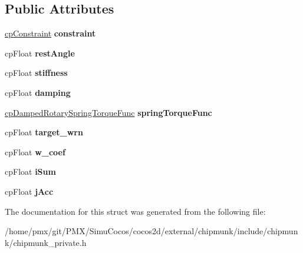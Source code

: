 \subsection*{Public Attributes}
\begin{DoxyCompactItemize}
\item 
\mbox{\label{structcpDampedRotarySpring_a57fd3d4154ca7f372245053e6953d3c6}} 
\hyperlink{structcpConstraint}{cp\+Constraint} {\bfseries constraint}
\item 
\mbox{\label{structcpDampedRotarySpring_a4a821b6b0e54400d892ce92d6990acdc}} 
cp\+Float {\bfseries rest\+Angle}
\item 
\mbox{\label{structcpDampedRotarySpring_ac2804128c9b92915ac8687367ff7c1ee}} 
cp\+Float {\bfseries stiffness}
\item 
\mbox{\label{structcpDampedRotarySpring_a3e85982c0b4f5aca75740fb83e5cae65}} 
cp\+Float {\bfseries damping}
\item 
\mbox{\label{structcpDampedRotarySpring_ab4bed9fc4db268dee126b07fe65ee8c3}} 
\hyperlink{group__cpDampedRotarySpring_ga072c236959020fab4f30087b5234040b}{cp\+Damped\+Rotary\+Spring\+Torque\+Func} {\bfseries spring\+Torque\+Func}
\item 
\mbox{\label{structcpDampedRotarySpring_aa92c6904380fe7f8f4fe9b0d76805885}} 
cp\+Float {\bfseries target\+\_\+wrn}
\item 
\mbox{\label{structcpDampedRotarySpring_a79e849ee8a77d2e9e433723f5e255a36}} 
cp\+Float {\bfseries w\+\_\+coef}
\item 
\mbox{\label{structcpDampedRotarySpring_a17b3619d2dcc24424ec3d853ac3cce2a}} 
cp\+Float {\bfseries i\+Sum}
\item 
\mbox{\label{structcpDampedRotarySpring_a85cb4bace17f0418d471e9dff81ff54f}} 
cp\+Float {\bfseries j\+Acc}
\end{DoxyCompactItemize}


The documentation for this struct was generated from the following file\+:\begin{DoxyCompactItemize}
\item 
/home/pmx/git/\+P\+M\+X/\+Simu\+Cocos/cocos2d/external/chipmunk/include/chipmunk/chipmunk\+\_\+private.\+h\end{DoxyCompactItemize}
